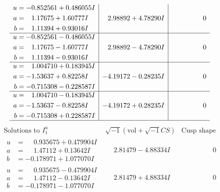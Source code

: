 \documentclass[1p]{elsarticle_modified}
\theoremstyle{definition}
\newcommand{\I}{\sqrt{-1}}
\begin{document}
$$\begin{array}{c|c|c}
\begin{aligned}
u &= -0.852561 + 0.486055 I \\
a &= \phantom{-}1.17675 + 1.60777 I \\
b &= \phantom{-}1.11394 + 0.93016 I\end{aligned}
 & \phantom{-}2.98892 + 4.78290 I & \phantom{-0.000000 } 0 \\ \hline\begin{aligned}
u &= -0.852561 - 0.486055 I \\
a &= \phantom{-}1.17675 - 1.60777 I \\
b &= \phantom{-}1.11394 - 0.93016 I\end{aligned}
 & \phantom{-}2.98892 - 4.78290 I & \phantom{-0.000000 } 0 \\ \hline\begin{aligned}
u &= \phantom{-}1.004710 + 0.183945 I \\
a &= -1.53637 + 0.82258 I \\
b &= -0.715308 - 0.228587 I\end{aligned}
 & -4.19172 - 0.28235 I & \phantom{-0.000000 } 0 \\ \hline\begin{aligned}
u &= \phantom{-}1.004710 - 0.183945 I \\
a &= -1.53637 - 0.82258 I \\
b &= -0.715308 + 0.228587 I\end{aligned}
 & -4.19172 + 0.28235 I & \phantom{-0.000000 } 0\\
 \hline 
 \end{array}$$\newpage$$\begin{array}{c|c|c}  
\text{Solutions to }I^u_{1}& \I (\text{vol} + \sqrt{-1}CS) & \text{Cusp shape}\\
 \hline 
\begin{aligned}
u &= \phantom{-}0.935675 + 0.479904 I \\
a &= \phantom{-}1.47112 + 0.13642 I \\
b &= -0.178971 + 1.077070 I\end{aligned}
 & \phantom{-}2.81479 - 4.88334 I & \phantom{-0.000000 } 0 \\ \hline\begin{aligned}
u &= \phantom{-}0.935675 - 0.479904 I \\
a &= \phantom{-}1.47112 - 0.13642 I \\
b &= -0.178971 - 1.077070 I\end{aligned}
 & \phantom{-}2.81479 + 4.88334 I & \phantom{-0.000000 } 0 \\ \hline\begin{aligned}

\end{aligned}
\end{array}$$
\end{document}
